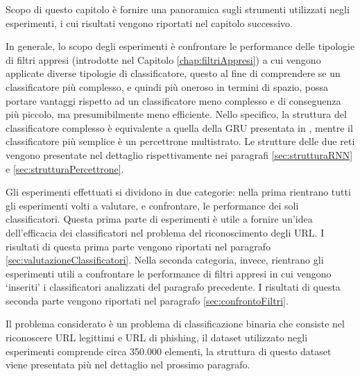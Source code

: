 \documentclass[../../main.tex]{subfiles}
\begin{document}
    Scopo di questo capitolo è fornire una panoramica sugli strumenti utilizzati negli esperimenti, i cui risultati vengono riportati nel capitolo successivo. 
    
    In generale, lo scopo degli esperimenti è confrontare le performance delle tipologie di filtri appresi (introdotte nel Capitolo \ref{chap:filtriAppresi}) a cui vengono applicate diverse tipologie di classificatore, questo al fine di comprendere se un classificatore più complesso, e quindi più oneroso in termini di spazio, possa portare vantaggi rispetto ad un classificatore meno complesso e di conseguenza più piccolo, ma presumibilmente meno efficiente. Nello specifico, la struttura del classificatore complesso è equivalente a quella della GRU presentata in \cite{ma2020}, mentre il classificatore più semplice è un percettrone multistrato. Le strutture delle due reti vengono presentate nel dettaglio rispettivamente nei paragrafi \ref{sec:strutturaRNN} e \ref{sec:strutturaPercettrone}.

    Gli esperimenti effettuati si dividono in due categorie: nella prima rientrano tutti gli esperimenti volti a valutare, e confrontare, le performance dei soli classificatori. Questa prima parte di esperimenti è utile a fornire un'idea dell'efficacia dei classificatori nel problema del riconoscimento degli URL. I risultati di questa prima parte vengono riportati nel paragrafo \ref{sec:valutazioneClassificatori}. Nella seconda categoria, invece, rientrano gli esperimenti utili a confrontare le performance di filtri appresi in cui vengono `inseriti' i classificatori analizzati del paragrafo precedente. I risultati di questa seconda parte vengono riportati nel paragrafo \ref{sec:confrontoFiltri}.

    Il problema considerato è un problema di classificazione binaria che consiste nel riconoscere URL legittimi e URL di phishing, il dataset utilizzato negli esperimenti comprende circa 350.000 elementi, la struttura di questo dataset viene presentata più nel dettaglio nel prossimo paragrafo. 
\end{document}
